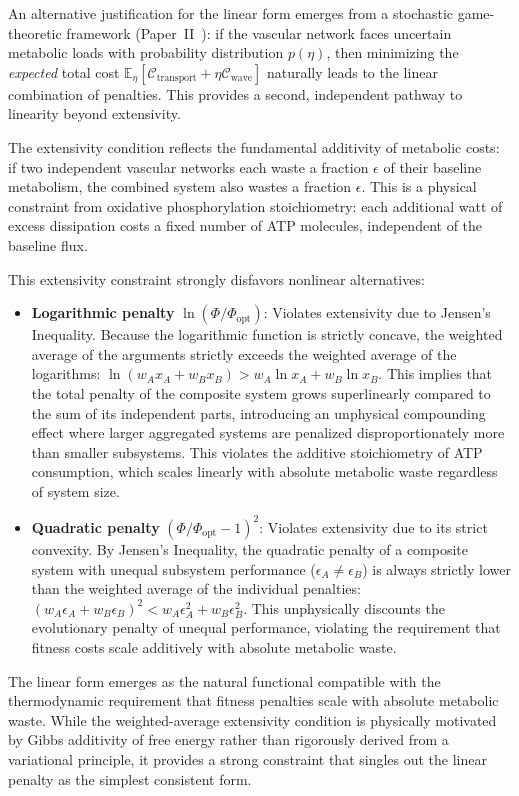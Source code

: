 \begin{remark}
An alternative justification for the linear form emerges from a stochastic
game-theoretic framework (Paper~II~\cite{paperII}): if the vascular network
faces uncertain metabolic loads with probability distribution $p(\eta)$, then
minimizing the \emph{expected} total cost
$\mathbb{E}_\eta[\mathcal{C}_{\mathrm{transport}} + \eta
\mathcal{C}_{\mathrm{wave}}]$ naturally leads to the linear combination of
penalties. This provides a second, independent pathway to linearity beyond
extensivity.
\end{remark}

\begin{remark}
The extensivity condition reflects the fundamental additivity of metabolic
costs: if two independent vascular networks each waste a fraction $\epsilon$ of
their baseline metabolism, the combined system also wastes a fraction
$\epsilon$. This is a physical constraint from oxidative phosphorylation
stoichiometry: each additional watt of excess dissipation costs a fixed number
of ATP molecules, independent of the baseline flux.

This extensivity constraint strongly disfavors nonlinear alternatives:
\begin{itemize}
    \item
\textbf{Logarithmic penalty} $\ln(\Phi/\Phi_{\mathrm{opt}})$: Violates
extensivity due to Jensen's Inequality. Because the logarithmic function is
strictly concave, the weighted average of the arguments strictly exceeds the
weighted average of the logarithms: $\ln(w_A x_A + w_B x_B) > w_A \ln x_A + w_B
\ln x_B$. This implies that the total penalty of the composite system grows
superlinearly compared to the sum of its independent parts, introducing an
unphysical compounding effect where larger aggregated systems are penalized
disproportionately more than smaller subsystems. This violates the additive
stoichiometry of ATP consumption, which scales linearly with absolute metabolic
waste regardless of system size.
    \item
\textbf{Quadratic penalty} $(\Phi/\Phi_{\mathrm{opt}} - 1)^2$: Violates
extensivity due to its strict convexity. By Jensen's Inequality, the quadratic
penalty of a composite system with unequal subsystem performance ($\epsilon_A
\neq \epsilon_B$) is always strictly lower than the weighted average of the
individual penalties: $(w_A\epsilon_A + w_B\epsilon_B)^2 < w_A\epsilon_A^2 +
w_B\epsilon_B^2$. This unphysically discounts the evolutionary penalty of
unequal performance, violating the requirement that fitness costs scale
additively with absolute metabolic waste.
\end{itemize}
The linear form emerges as the natural functional compatible with the
thermodynamic requirement that fitness penalties scale with absolute metabolic
waste. While the weighted-average extensivity condition is physically motivated
by Gibbs additivity of free energy rather than rigorously derived from a
variational principle, it provides a strong constraint that singles out the
linear penalty as the simplest consistent form.


\end{remark}
